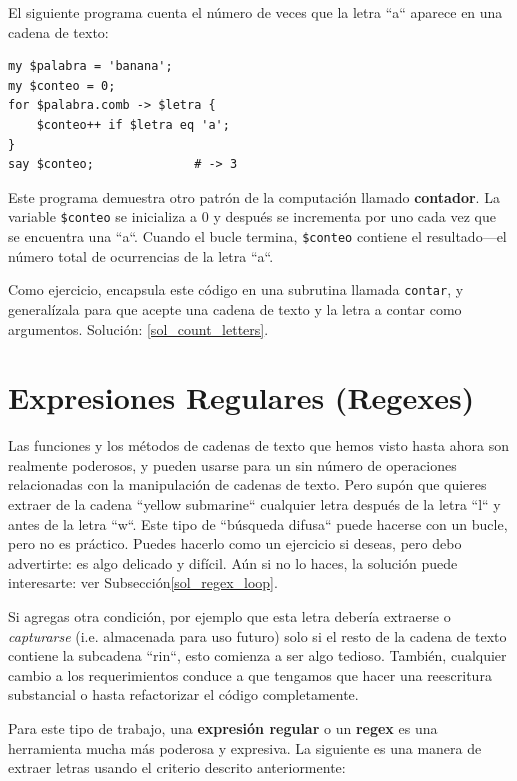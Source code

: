 El siguiente programa cuenta el número de veces que 
la letra ``a`` aparece en una cadena de texto:

\begin{verbatim}
my $palabra = 'banana';
my $conteo = 0;
for $palabra.comb -> $letra {
    $conteo++ if $letra eq 'a';
}
say $conteo;              # -> 3
\end{verbatim}
%

Este programa demuestra otro patrón de la computación 
llamado {\bf contador}. La variable \verb|$conteo| se inicializa
a 0 y después se incrementa por uno cada vez que se encuentra
una ``a``. Cuando el bucle termina, \verb|$conteo| contiene
el resultado---el número total de ocurrencias de la letra ``a``.

Como ejercicio, encapsula este código en una subrutina llamada
{\tt contar}, y generalízala para que acepte una cadena de texto 
y la letra a contar como argumentos. Solución: \ref{sol_count_letters}.
\label{count_letters}

\section{Expresiones Regulares (Regexes)}
\label{regex}

Las funciones y los métodos de cadenas de texto que hemos visto
hasta ahora son realmente poderosos, y pueden usarse para un 
sin número de operaciones relacionadas con la 
manipulación de cadenas de texto. Pero supón que quieres extraer
de la cadena ``yellow submarine`` cualquier letra después
de la letra ``l`` y antes de la letra ``w``. Este tipo de 
``búsqueda difusa`` puede hacerse con un bucle, pero no 
es práctico. Puedes hacerlo como un ejercicio si deseas,
pero debo advertirte: es algo delicado y difícil. Aún si 
no lo haces, la solución puede interesarte: 
ver Subsección\ref{sol_regex_loop}. 
\label{regex_loop}

Si agregas otra condición, por ejemplo que esta letra 
debería extraerse o \emph{capturarse} (i.e. almacenada para 
uso futuro) solo si el resto de la cadena de texto contiene
la subcadena ``rin``, esto comienza a ser algo tedioso. También,
cualquier cambio a los requerimientos conduce a que tengamos
que hacer una reescritura substancial o hasta refactorizar
el código completamente.

Para este tipo de trabajo, una {\bf expresión regular} 
o un {\bf regex} es una herramienta mucha más poderosa
y expresiva. La siguiente es una manera de extraer letras usando
el criterio descrito anteriormente: 


